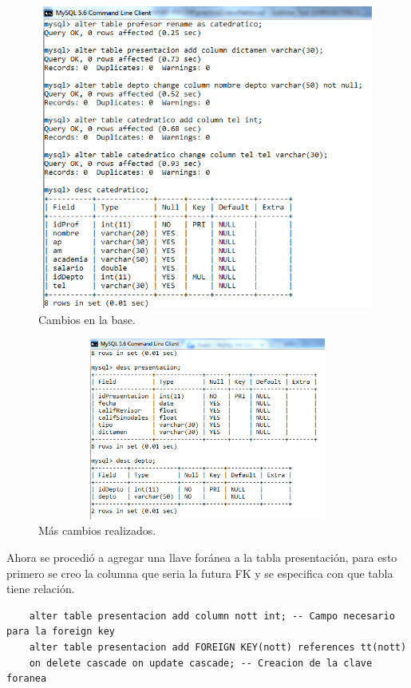 \documentclass[12pt, titlepage]{article}
\begin{document}
    \begin{figure}[H]
        \begin{center}
            \includegraphics[width=14cm, height=10cm]{img/cambios.png}
            \caption{Cambios en la base.}
            \label{fig:cambios}
        \end{center}
    \end{figure}
\begin{figure}[H]
    \begin{center}
        \includegraphics[width=12cm, height=6cm]{img/mascambios.png}
        \caption{Más cambios realizados.}
        \label{fig:cambios2}
    \end{center}
\end{figure}
    Ahora se procedió a agregar una llave foránea a la tabla presentación, para esto primero se creo la columna que seria la futura FK y se especifica con que tabla tiene relación.
    \begin{lstlisting}
    alter table presentacion add column nott int; -- Campo necesario para la foreign key
    alter table presentacion add FOREIGN KEY(nott) references tt(nott)
    on delete cascade on update cascade; -- Creacion de la clave foranea
    \end{lstlisting}
\end{document}
